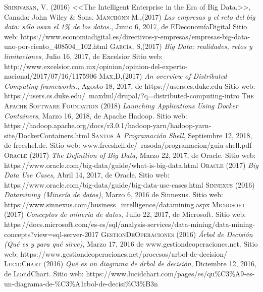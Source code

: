 \begin{thebibliography}{}
	 \textsc{Srinivasan, V.} (2016)
	<<The Intelligent Enterprise in the Era of Big Data.>>,
	Canada: John Wiley \& Sons.
	 \textsc{Manchónn M.},(2017)
	\textit{ Las empresas y el reto del big data: sólo usan el 1\% de los datos.},  Junio 6, 2017, de EDeconomíaDigital
	Sitio web: https://www.economiadigital.es/directivos-y-empresas/empresas-big-data-uno-por-ciento\_408504\_102.html
	 \textsc{García, S},(2017)
	\textit{Big Data: realidades, retos y limitaciones}, Julio 16, 2017, de Excelsior Sitio web:
	http://www.excelsior.com.mx/opinion/opinion-del-experto-nacional/2017/07/16/1175906	
	 \textsc{Max,D},(2017)
	\textit{ An overview of Distributed Computing frameworks.}, Agosto 18, 2017, de https://users.cs.duke.edu Sitio web:
	https://users.cs.duke.edu/~maxdml/drupal/?q=distributed-computing-intro
	 \textsc{The Apache Software Foundation} (2018)
	\textit{Launching Applications Using Docker Containers}, Marzo 16, 2018, de Apache Hadoop. Sitio web: https://hadoop.apache.org/docs/r3.0.1/hadoop-yarn/hadoop-yarn-site/DockerContainers.html
	 \textsc{Santos A}
	\textit{Programación Shell}, Septiembre 12, 2018, de freeshel.de. Sitio web: www.freeshell.de/~rasoda/programacion/guia-shell.pdf
	 \textsc{Oracle} (2017) \textit{The Definition of Big Data}, Marzo 22, 2017, de Oracle. Sitio web: https://www.oracle.com/big-data/guide/what-is-big-data.html
	 \textsc{Oracle} (2017) \textit{Big Data Use Cases}, Abril 14, 2017, de Oracle. Sitio web: https://www.oracle.com/big-data/guide/big-data-use-cases.html
	 \textsc{Sinnexus} (2016) \textit{Datamining (Minería de datos)}, Marzo 6, 2016 de Sinnexus. Sitio web: https://www.sinnexus.com/business\_intelligence/datamining.aspx
	 \textsc{Microsoft} (2017) \textit{Conceptos de minería de datos}, Julio 22, 2017, de Microsoft. Sitio web: https://docs.microsoft.com/es-es/sql/analysis-services/data-mining/data-mining-concepts?view=sql-server-2017
	 \textsc{GestionDeOperaciones} (2016) \textit{Árbol de Decisión (Qué es y para qué sirve)}, Marzo 17, 2016 de www.gestiondeoperaciones.net. Sitio web: https://www.gestiondeoperaciones.net/procesos/arbol-de-decision/
	 \textsc{LucidChart} (2016) \textit{Qué es un diagrama de árbol de decisión}, Diciembre 12, 2016, de LucidChart. Sitio web: https://www.lucidchart.com/pages/es/qu\%C3\%A9-es-un-diagrama-de-\%C3\%A1rbol-de-decisi\%C3\%B3n

\end{thebibliography}

